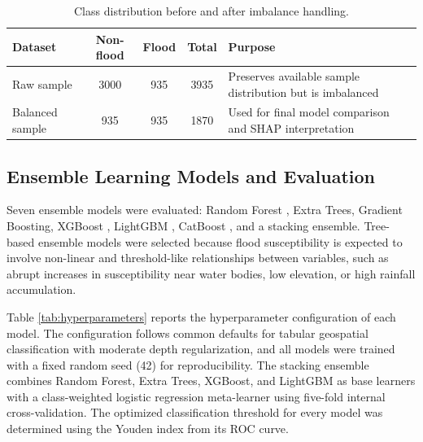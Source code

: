 \documentclass[11pt,twoside]{article}
\begin{document}
\begin{table}[ht]
\centering
\caption{Class distribution before and after imbalance handling.}
\label{tab:class-distribution}
\begin{tabular}{>{\raggedright}p{2.8cm}
                c c c
                >{\raggedright\arraybackslash}p{5.5cm}}
\hline
\textbf{Dataset} & \textbf{Non-flood} & \textbf{Flood} & \textbf{Total} &
\textbf{Purpose} \\
\hline
Raw sample & 3000 & 935 & 3935 & Preserves available sample distribution but is
imbalanced \\
Balanced sample & 935 & 935 & 1870 & Used for final model comparison and SHAP
interpretation \\
\hline
\end{tabular}
\end{table}
 
\subsection{Ensemble Learning Models and Evaluation}\label{ensemble-learning-models-and-evaluation}

Seven ensemble models were evaluated: Random Forest \cite{breiman2001},
Extra Trees, Gradient Boosting, XGBoost \cite{chen2016}, LightGBM \cite{ke2017},
CatBoost \cite{prokhorenkova2018}, and a stacking ensemble. Tree-based
ensemble models were selected because flood susceptibility is expected to involve
non-linear and threshold-like relationships between variables, such as abrupt
increases in susceptibility near water bodies, low elevation, or high rainfall
accumulation.

Table \ref{tab:hyperparameters} reports the hyperparameter configuration of
each model. The configuration follows common defaults for tabular
geospatial classification with moderate depth regularization, and all models
were trained with a fixed random seed (42) for reproducibility. The stacking
ensemble combines Random Forest, Extra Trees, XGBoost, and LightGBM as base
learners with a class-weighted logistic regression meta-learner using five-fold
internal cross-validation. The optimized classification threshold for every
model was determined using the Youden index from its ROC curve.
\end{document}
